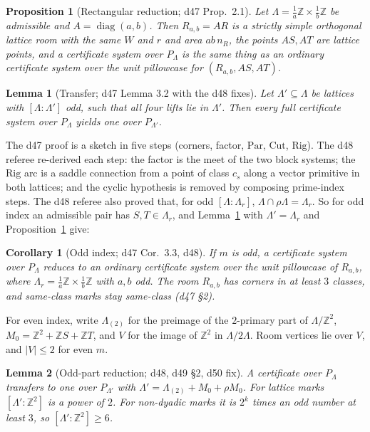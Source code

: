 \documentclass[11pt]{article}
\newtheorem{lemma}{Lemma}
\newtheorem{proposition}{Proposition}
\newtheorem{corollary}{Corollary}
\theoremstyle{definition}
\theoremstyle{remark}
\newcommand{\Z}{\mathbb Z}
\newcommand{\Par}{\mathrm{Par}}
\newcommand{\Rig}{\mathrm{Rig}}
\newcommand{\Cut}{\mathrm{Cut}}
\begin{document}
\begin{proposition}[Rectangular reduction; d47 Prop.~2.1]\label{prop:rect}
Let $\Lambda=\frac1a\Z\times\frac1b\Z$ be admissible and
$A=\operatorname{diag}(a,b)$. Then $R_{a,b}=AR$ is a strictly simple orthogonal
lattice room with the same $W$ and $r$ and area $ab\,n_R$, the points $AS,AT$
are lattice points, and a certificate system over $P_\Lambda$ is the same thing
as an ordinary certificate system over the unit pillowcase for
$(R_{a,b},AS,AT)$.
\end{proposition}

\begin{lemma}[Transfer; d47 Lemma 3.2 with the d48 fixes]\label{lem:transfer}
Let $\Lambda'\subseteq\Lambda$ be lattices with $[\Lambda:\Lambda']$ odd, such
that all four lifts lie in $\Lambda'$. Then every full certificate system over
$P_\Lambda$ yields one over $P_{\Lambda'}$.
\end{lemma}

The d47 proof is a sketch in five steps (corners, factor, $\Par$, $\Cut$,
$\Rig$). The d48 referee re-derived each step: the factor is the meet of the
two block systems; the $\Rig$ arc is a saddle connection from a point of class
$c_s$ along a vector primitive in both lattices; and the cyclic hypothesis is
removed by composing prime-index steps. The d48 referee also proved that, for
odd $[\Lambda:\Lambda_r]$, $\Lambda\cap\rho\Lambda=\Lambda_r$. So for odd index
an admissible pair has $S,T\in\Lambda_r$, and Lemma~\ref{lem:transfer} with
$\Lambda'=\Lambda_r$ and Proposition~\ref{prop:rect} give:

\begin{corollary}[Odd index; d47 Cor.~3.3, d48]\label{cor:odd}
If $m$ is odd, a certificate system over $P_\Lambda$ reduces to an ordinary
certificate system over the unit pillowcase of $R_{a,b}$, where
$\Lambda_r=\frac1a\Z\times\frac1b\Z$ with $a,b$ odd. The room $R_{a,b}$ has
corners in at least $3$ classes, and same-class marks stay same-class
(d47 \S2).
\end{corollary}

For even index, write $\Lambda_{(2)}$ for the preimage of the $2$-primary part
of $\Lambda/\Z^2$, $M_0=\Z^2+\Z S+\Z T$, and $V$ for the image of $\Z^2$ in
$\Lambda/2\Lambda$. Room vertices lie over $V$, and $|V|\le 2$ for even $m$.

\begin{lemma}[Odd-part reduction; d48, d49 \S2, d50 fix]\label{lem:oddpart}
A certificate over $P_\Lambda$ transfers to one over $P_{\Lambda'}$ with
$\Lambda'=\Lambda_{(2)}+M_0+\rho M_0$. For lattice marks
$[\Lambda':\Z^2]$ is a power of $2$. For non-dyadic marks it is $2^k$ times an
odd number at least $3$, so $[\Lambda':\Z^2]\ge 6$.
\end{lemma}
\end{document}
